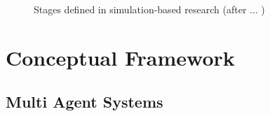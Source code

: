 \documentclass{report}
\begin{document}
\begin{figure}[tp]
\setlength\fboxsep{0pt}
\setlength\fboxrule{0.5pt}
\caption{Stages defined in simulation-based research (after ... )}
\label{fig:SimTL}
\end{figure}







\section{Conceptual Framework}

\subsection{Multi Agent Systems} %


\end{document}
